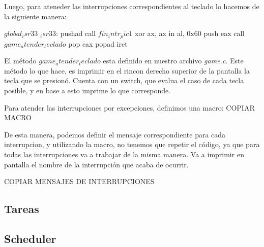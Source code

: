 Luego, para ateneder las interrupciones correspondientes al teclado lo hacemos de la siguiente manera:
\begin{algorithmic}
    \State \tab $global _isr33$
\State \tab \tab $_isr33$:
  \State \tab \tab pushad
  \State \tab \tab call $fin_intr_pic1$
  \State \tab \tab xor ax, ax
	\State \tab \tab in al, 0x60
  \State \tab \tab push eax
	\State \tab \tab call $game_atender_teclado$
  \State \tab \tab pop eax
  \State \tab \tab popad
	\State \tab iret
\end{algorithmic}

El m\'etodo \textit{$game_atender_teclado$} esta definido en nuestro archivo \textit{game.c}. Este m\'etodo lo que hace, es imprimir en el rincon derecho superior de la pantalla la tecla que se presion\'o.
Cuenta con un switch, que evalua el caso de cada tecla posible, y en base a esto imprime lo que corresponde.


Para atender las interrupciones por excepciones, definimos una macro:
COPIAR MACRO

De esta manera, podemos definir el mensaje correspondiente para cada interrupcion, y utilizando la macro, no tenemos que repetir el c\'odigo, ya que para todas las interrupciones va a trabajar de la misma manera. Va a imprimir en pantalla el nombre de la interrupci\'on que acaba de ocurrir.

COPIAR MENSAJES DE INTERRUPCIONES

\subsection{Tareas}

\subsection{Scheduler}


